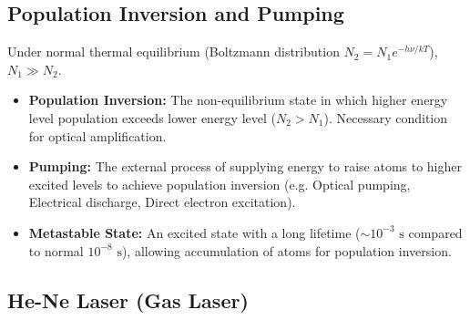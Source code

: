 \documentclass[12pt,a4paper]{article}
\begin{document}
\subsection{Population Inversion and Pumping}

Under normal thermal equilibrium (Boltzmann distribution $N_2 = N_1 e^{-h\nu/kT}$), $N_1 \gg N_2$.

\begin{tcolorbox}[defbox, title={\textbf{Definition: Population Inversion and Pumping}}]
\begin{itemize}[leftmargin=*, itemsep=2pt]
  \item \textbf{Population Inversion:} The non-equilibrium state in which higher energy level population exceeds lower energy level ($N_2 > N_1$). Necessary condition for optical amplification.
  \item \textbf{Pumping:} The external process of supplying energy to raise atoms to higher excited levels to achieve population inversion (e.g. Optical pumping, Electrical discharge, Direct electron excitation).
  \item \textbf{Metastable State:} An excited state with a long lifetime ($\sim 10^{-3}\text{ s}$ compared to normal $10^{-8}\text{ s}$), allowing accumulation of atoms for population inversion.
\end{itemize}
\end{tcolorbox}

\subsection{He-Ne Laser (Gas Laser)}
\end{document}
